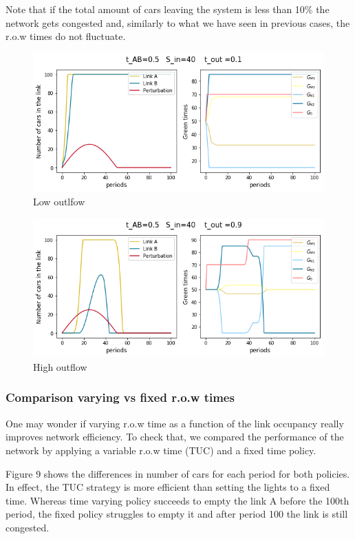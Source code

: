 \documentclass[11pt]{article}
\begin{document}
Note that if the total amount of cars leaving the system is less than 10\% the network gets congested and, similarly to what we have seen in previous cases, the r.o.w times do not fluctuate.

\begin{figure}[h!]
    \caption{Low outlfow}
      \centering
	\includegraphics[width=13cm]{sim3}
\end{figure}

\begin{figure}[h!]
    \caption{High outflow}
      \centering
	\includegraphics[width=13cm]{sim6}
\end{figure}

\subsubsection{Comparison varying vs fixed r.o.w times}

One may wonder if varying r.o.w time as a function of the link occupancy really improves network efficiency. To check that, we compared the performance of the network by applying a variable r.o.w time (TUC) and a fixed time policy. 

Figure 9 shows the differences in number of cars for each period for both policies. In effect, the TUC strategy is more efficient than setting the lights to a fixed time. Whereas time varying policy succeeds to empty the link A before the 100th period, the fixed policy struggles to empty it and after period 100 the link is still congested.
\end{document}

